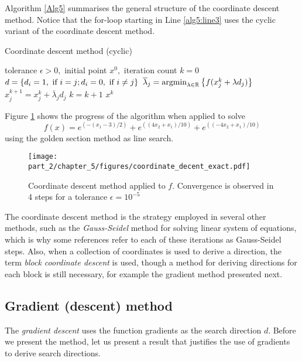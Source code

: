 Algorithm \ref{Alg5} summarises the general structure of the coordinate descent method. Notice that the for-loop starting in Line \ref{alg5:line3} uses the cyclic variant of the coordinate descent method. 

\begin{algorithm}[h]
\caption{Coordinate descent method (cyclic)} \label{Alg5}
\begin{algorithmic}[1] %
 tolerance $\epsilon > 0,$ initial point $x^0,$ iteration count $k = 0$ 
     \label{alg5:line3}
        \State $d =\left\{ d_i = 1, \text{ if } i=j; d_i = 0, \text{ if } i \neq j \right \}$
        \State $\overline{\lambda}_j = \mathop{\rm argmin}_{\lambda \in \mathbb{R}}\left\{ f(x_j^k + \lambda d_j) \right \}$
        \State $x^{k+1}_j = x^k_j + \overline{\lambda}_j  d_j$
    \EndFor
    \State $k = k+1$
\EndWhile
{} $x^k$
\end{algorithmic}
\end{algorithm}

Figure \ref{fig:coordinate_descent} shows the progress of the algorithm when applied to solve 
$$f(x)=e^{(-(x_1-3)/2)} + e^{((4x_2 + x_1)/10)} + e^{((-4x_2 + x_1)/10)}$$ using the golden section method as line search. 

\begin{figure}[h]
\texttt{[image: part\_2/chapter\_5/figures/coordinate\_decent\_exact.pdf]}	
\caption{Coordinate descent method applied to $f$. Convergence is observed in 4 steps for a tolerance $\epsilon = 10^{-5}$} \label{fig:coordinate_descent}
\end{figure}

The coordinate descent method is the strategy employed in several other methods, such as the \emph{Gauss-Seidel} method for solving linear system of equations, which is why some references refer to each of these iterations as Gauss-Seidel steps. Also, when a collection of coordinates is used to derive a direction, the term \emph{block coordinate descent} is used, though a method for deriving directions for each block is still necessary, for example the gradient method presented next.  


\subsection{Gradient (descent) method}

The \emph{gradient descent} uses the function gradients as the search direction $d$. Before we present the method, let us present a result that justifies the use of gradients to derive search directions. 

